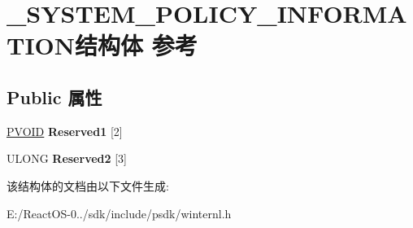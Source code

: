 \hypertarget{struct___s_y_s_t_e_m___p_o_l_i_c_y___i_n_f_o_r_m_a_t_i_o_n}{}\section{\+\_\+\+S\+Y\+S\+T\+E\+M\+\_\+\+P\+O\+L\+I\+C\+Y\+\_\+\+I\+N\+F\+O\+R\+M\+A\+T\+I\+O\+N结构体 参考}
\label{struct___s_y_s_t_e_m___p_o_l_i_c_y___i_n_f_o_r_m_a_t_i_o_n}
\subsection*{Public 属性}
\begin{DoxyCompactItemize}
\item 
\mbox{\label{struct___s_y_s_t_e_m___p_o_l_i_c_y___i_n_f_o_r_m_a_t_i_o_n_acc1c4fe3df9dfda52bdba8fce5fc191a}} 
\hyperlink{interfacevoid}{P\+V\+O\+ID} {\bfseries Reserved1} \mbox{[}2\mbox{]}
\item 
\mbox{\label{struct___s_y_s_t_e_m___p_o_l_i_c_y___i_n_f_o_r_m_a_t_i_o_n_a1183480b00ed86e750ab8f1bce8e72a8}} 
U\+L\+O\+NG {\bfseries Reserved2} \mbox{[}3\mbox{]}
\end{DoxyCompactItemize}


该结构体的文档由以下文件生成\+:\begin{DoxyCompactItemize}
\item 
E\+:/\+React\+O\+S-\/0../sdk/include/psdk/winternl.\+h\end{DoxyCompactItemize}
